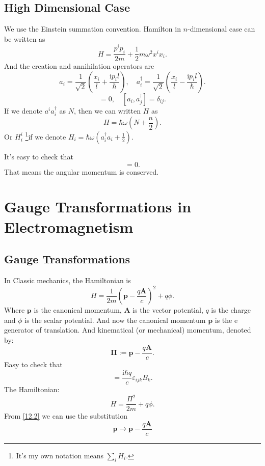 \documentclass{article}
\theoremstyle{1}
\newcommand{\ii}{\mathrm{i}}
\begin{document}
\subsection{High Dimensional Case}
We use the Einstein summation convention. Hamilton in $n$-dimensional case can be written as
\begin{equation}
    H=\frac{p^ip_i}{2m}+\frac{1}{2}m\omega^2x^ix_i.
\end{equation}
And the creation and annihilation operators are
\begin{equation}
    a_i=\frac{1}{\sqrt{2}}\left(\frac{x_i}{l}+\frac{\ii p_il}{\hbar}\right), \quad a^\dagger_i=\frac{1}{\sqrt{2}}\left(\frac{x_i}{l}-\frac{\ii p_il}{\hbar}\right).
\end{equation}
\begin{equation}
    [a_i,a_j]=0,\quad [a_i,a^\dagger_j]=\delta_{ij}.
\end{equation}
If we denote $a^ia_i^\dagger$ as $N$, then we can written $H$ as 
\begin{equation}
    H=\hbar \omega (N+\frac{n}{2}).
\end{equation}
Or $H^i_i$ \footnote{It's my own notation means $\displaystyle \sum_i H_i.$}if we denote $H_i=\hbar \omega (a_i^\dagger a_i+\frac{1}{2})$.

It's easy to check that 
\begin{equation}
    [a_i^\dagger a_j,H]=0.
\end{equation}
That means the angular momentum is conserved.


\section{Gauge Transformations in Electromagnetism}
\subsection{Gauge Transformations}
\label{charged case}In Classic mechanics, the Hamiltonian is
\begin{equation}
    H=\frac{1}{2m}\left(\mathbf{p}-\frac{q\mathbf{A}}{c}\right)^2+q\phi.
\end{equation}
Where $\mathbf{p}$ is the canonical momentum, $\mathbf{A}$ is the vector potential, $q$ is the charge and $\phi$ is the scalar potential. And now the canonical momentum $\mathbf{p}$ is the e generator of translation. And kinematical (or mechanical) momentum, denoted by:
\begin{equation}\label{12.2}
    \mathbf{\Pi}:=\mathbf{p}-\frac{q\mathbf{A}}{c}.
\end{equation}
Easy to check that
\begin{equation}
    [\Pi_i,\Pi_j]=\frac{\ii\hbar q}{c}\varepsilon_{ijk}B_k.
\end{equation}
The Hamiltonian:
\begin{equation}
    H=\frac{\Pi^2}{2m}+q\phi.
\end{equation}
From \eqref{12.2} we can use the substitution 
\begin{equation}
    \mathbf{p}\longrightarrow \mathbf{p}-\frac{q\mathbf{A}}{c}
\end{equation}
\end{document}
